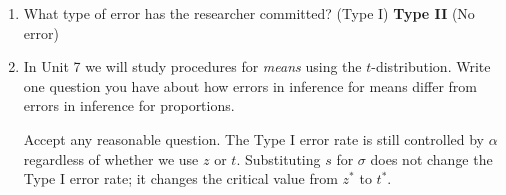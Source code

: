 \documentclass[10pt]{article}
\begin{document}
\begin{enumerate}
        \begin{enumerate}[label=\alph*.]
          \item What type of error has the researcher committed? \quad
                (Type I) \quad \textcolor{keyred}{\textbf{Type II}} \quad (No error)

                \vspace{0.05in}
          \item In Unit 7 we will study procedures for \emph{means} using the
                $t$-distribution. Write one question you have about how errors in
                inference for means differ from errors in inference for proportions.

                \begin{teachernote}
                    Accept any reasonable question. The Type I error rate is still
                    controlled by $\alpha$ regardless of whether we use $z$ or $t$.
                    Substituting $s$ for $\sigma$ does not change the Type I error rate;
                    it changes the critical value from $z^*$ to $t^*$.
                \end{teachernote}
        \end{enumerate}
\end{enumerate}
\end{document}

